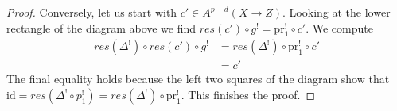 \begin{proof}
\medskip\noindent
Conversely, let us start with $c' \in A^{p - d}(X \to Z)$. Looking
at the lower rectangle of the diagram above we find
$res(c') \circ g^! = \text{pr}_1^! \circ c'$.
We compute
\begin{align*}
res(\Delta^!) \circ res(c') \circ g^!
& =
res(\Delta^!) \circ \text{pr}_1^! \circ c' \\
& =
c'
\end{align*}
The final equality holds because the left two squares of
the diagram show that
$\text{id} = res(\Delta^! \circ p_1^!) = res(\Delta^!) \circ \text{pr}_1^!$.
This finishes the proof.
\end{proof}